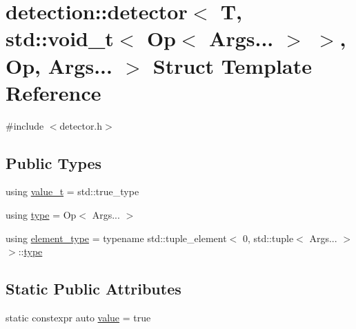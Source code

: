 \hypertarget{structdetection_1_1detector_3_01_t_00_01std_1_1void__t_3_01_op_3_01_args_8_8_8_01_4_01_4_00_01_op_00_01_args_8_8_8_01_4}{}\section{detection\+:\+:detector$<$ T, std\+:\+:void\+\_\+t$<$ Op$<$ Args... $>$ $>$, Op, Args... $>$ Struct Template Reference}
\label{structdetection_1_1detector_3_01_t_00_01std_1_1void__t_3_01_op_3_01_args_8_8_8_01_4_01_4_00_01_op_00_01_args_8_8_8_01_4}


{\ttfamily \#include $<$detector.\+h$>$}

\subsection*{Public Types}
\begin{DoxyCompactItemize}
\item 
using \hyperlink{structdetection_1_1detector_3_01_t_00_01std_1_1void__t_3_01_op_3_01_args_8_8_8_01_4_01_4_00_01_op_00_01_args_8_8_8_01_4_a79dba66a2b28306ae81d4503850baa23}{value\+\_\+t} = std\+::true\+\_\+type
\item 
using \hyperlink{structdetection_1_1detector_3_01_t_00_01std_1_1void__t_3_01_op_3_01_args_8_8_8_01_4_01_4_00_01_op_00_01_args_8_8_8_01_4_af2ff6315eed30c25ddcc2ad5c56c4f3e}{type} = Op$<$ Args... $>$
\item 
using \hyperlink{structdetection_1_1detector_3_01_t_00_01std_1_1void__t_3_01_op_3_01_args_8_8_8_01_4_01_4_00_01_op_00_01_args_8_8_8_01_4_a9f8088c1ec1a97ff05fa3a7993893f48}{element\+\_\+type} = typename std\+::tuple\+\_\+element$<$ 0, std\+::tuple$<$ Args... $>$ $>$\+::\hyperlink{structdetection_1_1detector_3_01_t_00_01std_1_1void__t_3_01_op_3_01_args_8_8_8_01_4_01_4_00_01_op_00_01_args_8_8_8_01_4_af2ff6315eed30c25ddcc2ad5c56c4f3e}{type}
\end{DoxyCompactItemize}
\subsection*{Static Public Attributes}
\begin{DoxyCompactItemize}
\item 
static constexpr auto \hyperlink{structdetection_1_1detector_3_01_t_00_01std_1_1void__t_3_01_op_3_01_args_8_8_8_01_4_01_4_00_01_op_00_01_args_8_8_8_01_4_a13a4f41e748fa0a5a4a1cd058d9599f7}{value} = true
\end{DoxyCompactItemize}


